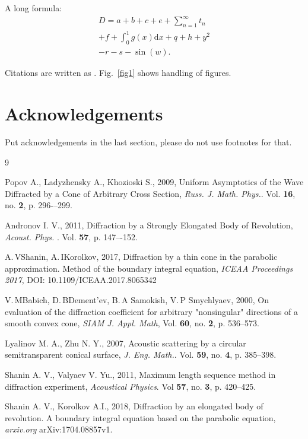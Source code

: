 \documentclass{procDDs}
\begin{document}
A long formula:
\begin{multline}
D=a+b+c+e+\sum_{n=1}^\infty t_n\\
+f+\int_0^1g(x)\mathrm{d}x+q+h+y^2\\
-r-s-\sin(w).
\end{multline}
 
 
Citations are written as \cite{paper1}.           %
Fig.~\ref{fig1} shows handling of figures.




\section*{Acknowledgements}

Put acknowledgements in the last section, please do not use footnotes for that.

\fi
\begin {thebibliography}{9}
	
 Popov A., Ladyzhensky A., Khozioski S., 2009, Uniform Asymptotics of the Wave Diffracted by a Cone of Arbitrary Cross Section,  \emph{Russ. J. Math. Phys.}. Vol. \textbf{16}, no. \textbf{2}, p. 296-–299.
	
 Andronov I. V., 2011, Diffraction by a Strongly Elongated Body of Revolution, \emph{Acoust. Phys.} . Vol. \textbf{57}, p. 147–-152.
	
 A.\,V\;Shanin, A.\,I\;Korolkov, 2017,  Diffraction by a thin cone in the parabolic approximation. Method of the boundary integral equation, \emph{ICEAA Proceedings 2017}, DOI: 10.1109/ICEAA.2017.8065342
	
 V.\,M\;Babich, D.\,B\;Dement'ev, B.\,A\; Samokish, V.\,P\; Smychlyaev, 2000, On evaluation of the diffraction coefficient for arbitrary "nonsingular" directions of a smooth convex cone, \emph{SIAM J. Appl. Math}, Vol. \textbf{60}, no. \textbf{2}, p. 536--573.
	
 Lyalinov M. A., Zhu N. Y., 2007, Acoustic scattering by a circular semitransparent conical surface, \emph{J. Eng. Math.}. Vol. \textbf{59}, no. \textbf{4}, p. 385--398.
	
 Shanin A. V., Valyaev V. Yu., 2011, Maximum length sequence method in diffraction experiment, \emph{Acoustical Physics}. Vol \textbf{57}, no. \textbf{3}, p. 420--425.

 Shanin A. V., Korolkov A.I., 2018, Diffraction by an elongated body of revolution. A boundary integral equation based on the parabolic equation, \emph{arxiv.org} arXiv:1704.08857v1.

\end{thebibliography}
\end{document}
